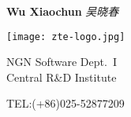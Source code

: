 ﻿\documentclass[12]{article}
\begin{document}
{
\textbf{Wu Xiaochun}
}
\textit{吴晓春}

\begin{minipage}[t]{1\textwidth}
\vspace{-6mm}
\begin{minipage}[c]{21mm}%
\texttt{[image: zte-logo.jpg]}
\end{minipage}%
\begin{minipage}[c]{40mm}%
NGN Software Dept.~I\\
Central R\&D Institute
\end{minipage}
\vspace{1mm}
\end{minipage}
{
TEL:(+86)025-52877209
}
\end{document}
